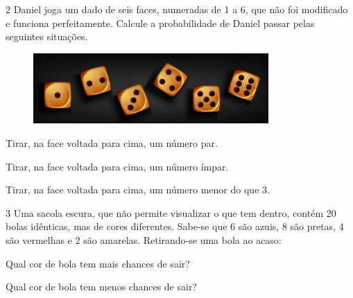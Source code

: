 \num{2} Daniel joga um dado de seis faces, numeradas de 1 a 6, que não foi modificado e funciona perfeitamente. Calcule a probabilidade de Daniel passar pelas seguintes situações.

\begin{figure}[htpb!]
\centering
\includegraphics[width=0.8\textwidth]{./media/image75a.jpg}
\end{figure}

\begin{escolha}
\item Tirar, na face voltada para cima, um número par.\\

\item Tirar, na face voltada para cima, um número ímpar.\\

\item Tirar, na face voltada para cima, um número menor do que 3.\\
\end{escolha}

\num{3} Uma sacola escura, que não permite visualizar o que tem dentro, contém
20 bolas idênticas, mas de cores diferentes. Sabe-se que 6 são azuis, 8
são pretas, 4 são vermelhas e 2 são amarelas. Retirando-se uma bola ao
acaso:

\begin{escolha}
\item Qual cor de bola tem mais chances de sair?\\

\item  Qual cor de bola tem menos chances de sair?\\
\end{escolha}

